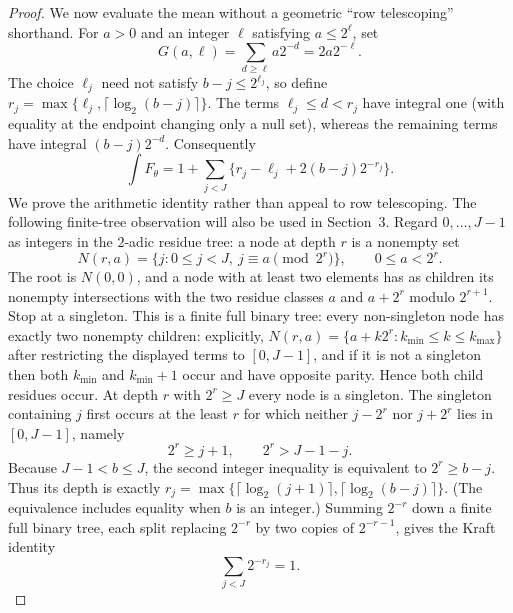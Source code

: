 \documentclass[11pt]{article}
\numberwithin{equation}{section}
\newcommand{\1}{\mathbf 1}\newcommand{\F}{\mathcal F}\newcommand{\D}{\mathcal D}
\begin{document}
\begin{proof}
We now evaluate the mean without a geometric ``row telescoping'' shorthand.
For $a>0$ and an integer $\ell$ satisfying $a\leq2^\ell$, set
\[
 G(a,\ell)=\sum_{d\geq\ell}a2^{-d}=2a2^{-\ell}.
\]
The choice $\ell_j$ need not satisfy $b-j\leq2^{\ell_j}$, so define
$r_j=\max\{\ell_j,\lceil\log_2(b-j)\rceil\}$.  The terms
$\ell_j\leq d<r_j$ have integral one (with equality at the endpoint changing
only a null set), whereas the remaining terms have integral $(b-j)2^{-d}$.
Consequently
\begin{equation}
 \int F_\theta=1+\sum_{j<J}\{r_j-\ell_j+2(b-j)2^{-r_j}\}.       \tag{1.3}
\end{equation}
We prove the arithmetic identity rather than appeal to row telescoping.  The
following finite-tree observation will also be used in Section~3.  Regard
$0,\ldots,J-1$ as integers in the $2$-adic residue tree: a node at depth
$r$ is a nonempty set
\[
 N(r,a)=\{j:0\leq j<J,\ j\equiv a\pmod {2^r}\},
 \qquad 0\leq a<2^r.
\]
The root is $N(0,0)$, and a node with at least two elements has as children
its nonempty intersections with the two residue classes $a$ and $a+2^r$
modulo $2^{r+1}$.  Stop at a singleton.  This is a finite full binary tree:
every non-singleton node has exactly two nonempty children: explicitly,
$N(r,a)=\{a+k2^r:k_{\min}\leq k\leq k_{\max}\}$ after restricting
the displayed terms to $[0,J-1]$, and if it is not a singleton then both
$k_{\min}$ and $k_{\min}+1$ occur and have opposite parity.  Hence both
child residues occur.  At depth $r$ with $2^r\geq J$ every node is a
singleton.
The singleton containing $j$ first occurs at the least $r$ for which neither
$j-2^r$ nor $j+2^r$ lies in $[0,J-1]$, namely
\[
 2^r\geq j+1,\qquad 2^r>J-1-j.
\]
Because $J-1<b\leq J$, the second integer inequality is equivalent to
$2^r\geq b-j$.  Thus its depth is exactly
$r_j=\max\{\lceil\log_2(j+1)\rceil,
\lceil\log_2(b-j)\rceil\}$.  (The equivalence includes equality when
$b$ is an integer.)  Summing $2^{-r}$ down a finite full binary tree, each
split replacing $2^{-r}$ by two copies of $2^{-r-1}$, gives the Kraft identity
\begin{equation}
             \sum_{j<J}2^{-r_j}=1.                            \tag{1.4}
\end{equation}


\end{proof}
\end{document}
